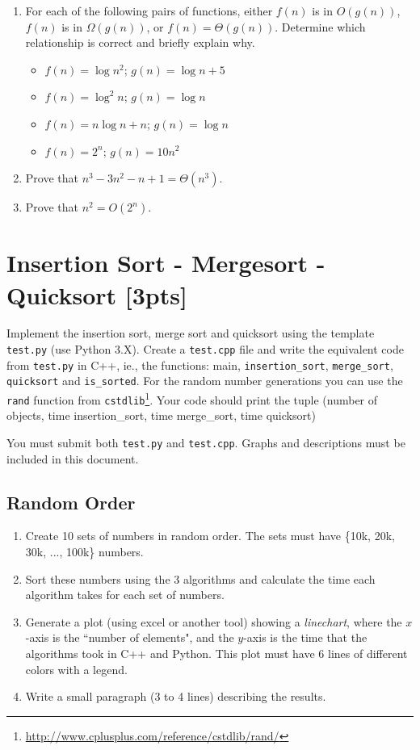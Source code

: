 \documentclass{article}
\begin{document}
\begin{enumerate}[label=\Alph*]
  \item For each of the following pairs of functions, either $f(n)$ is in $O(g(n))$, $f(n)$ is in $\Omega(g(n))$, or $f(n) = \Theta(g(n))$. Determine which relationship is correct and briefly explain why.
    \begin{itemize}
      \item $f(n) = \log n^2$; $g(n) = \log n + 5$
      \item $f(n) = \log^2 n$; $g(n) = \log n$
      \item $f(n) = n\log n + n$; $g(n) = \log n$
      \item $f(n) = 2^n$; $g(n) = 10n^2$
    \end{itemize}
  
  \item Prove that $n^3 -3n^2 -n+1 = \Theta(n^3)$.
  \item Prove that $n^2 = O(2^n)$.
  
\end{enumerate}


\section{Insertion Sort - Mergesort - Quicksort [3pts]}
Implement the insertion sort, merge sort and quicksort using the template \texttt{test.py} (use Python 3.X). Create a \texttt{test.cpp} file and write the equivalent code from \texttt{test.py} in C++, ie., the functions: main, \texttt{insertion\_sort}, \texttt{merge\_sort}, \texttt{quicksort} and \texttt{is\_sorted}. For the random number generations you can use the \texttt{rand} function from \texttt{cstdlib}\footnote{\url{http://www.cplusplus.com/reference/cstdlib/rand/}}. Your code should print the tuple (number of objects, time insertion\_sort, time merge\_sort, time quicksort)

You must submit both \texttt{test.py} and \texttt{test.cpp}. Graphs and descriptions must be included in this document. 

\subsection{Random Order}
\begin{enumerate}
  \item Create 10 sets of numbers in random order. The sets must have \{10k, 20k, 30k, ..., 100k\} numbers.
  
  \item Sort these numbers using the 3 algorithms and calculate the time each algorithm takes for each set of numbers.
  
  \item Generate a plot (using excel or another tool) showing a \emph{linechart}, where the $x$-axis is the ``number of elements", and the $y$-axis is the time that the algorithms took in C++ and Python. This plot must have 6 lines of different colors with a legend.
  
  \item Write a small paragraph (3 to 4 lines) describing the results.

\end{enumerate}
\end{document}

